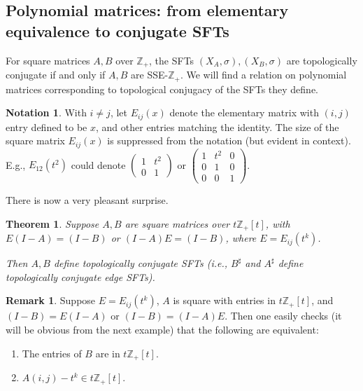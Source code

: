 \documentclass{amsart}
\newtheorem{thm}[equation]{Theorem}
\theoremstyle{definition}
\newtheorem{rem}[equation]{Remark}
\newtheorem{nota}[equation]{Notation}
\theoremstyle{definition}
\newcommand{\Z}{\mathbb Z}
\numberwithin{equation}{subsection}
\begin{document}

\subsection{Polynomial matrices: from  elementary equivalence
to conjugate SFTs}
For square matrices $A,B$ over $\Z_+$,
the SFTs $(X_A, \sigma), (X_B, \sigma)$ are
topologically conjugate  if and only if
$A,B$ are SSE-$\Z_+$.
We will find a relation on polynomial matrices corresponding
to topological conjugacy of the SFTs they define.
\begin{nota} With $i\neq j$,  let $E_{ij}(x)$ denote
the  elementary  matrix
with $(i,j)$ entry defined to
be $x$, and other entries matching the identity.
The size of the square  matrix $E_{ij}(x)$ is suppressed from
the notation (but evident in context).
E.g.,
$E_{12}(t^2)$ could denote $ \begin{pmatrix} 1&t^2\\0&1 \end{pmatrix}$ or
$ \begin{pmatrix} 1&t^2&0\\0&1&0 \\ 0&0&1  \end{pmatrix}$.
\end{nota}
There is now a very pleasant surprise.
\begin{thm} \label{thm:ElEqtoConj}
Suppose  $A,B$ are square matrices over $t\Z_+[t]$,
with $E(I-A) = (I-B)$ or $(I-A)E=(I-B)$, where
$E=E_{ij}(t^k)$.

Then $A,B$
define topologically
conjugate SFTs (i.e., $B^{\sharp}$ and $A^{\sharp}$ define
topologically  conjugate edge SFTs).  \end{thm}
\begin{rem}  Suppose
$E=E_{ij}(t^k)$, $A$ is square with entries in $t\Z_+[t]$, and
$(I-B)=E(I-A)$ or $(I-B)=(I-A)E$.
Then one easily checks (it will be obvious from the next example)
that the following are equivalent:
\begin{enumerate}
\item
The entries of $B$ are in $t\Z_+[t]$.
\item
$A(i,j) -t^k \in t\Z_+[t]$.
\end{enumerate}
\end{rem}
\end{document}
